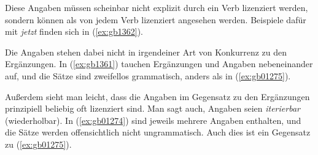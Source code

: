 \begin{exe}
  \ex\label{ex:gb1360}
  \begin{xlist}
  \end{xlist}
\end{exe}

Diese Angaben müssen scheinbar nicht explizit durch ein Verb lizenziert werden, sondern können als von jedem Verb lizenziert angesehen werden.
Beispiele dafür mit \textit{jetzt} finden sich in (\ref{ex:gb1362}).

\begin{exe}
  \ex\label{ex:gb1362}
  \begin{xlist}
  \end{xlist}
\end{exe}

Die Angaben stehen dabei nicht in irgendeiner Art von Konkurrenz zu den Ergänzungen.
In (\ref{ex:gb1361}) tauchen Ergänzungen und Angaben nebeneinander auf, und die Sätze sind zweifellos grammatisch, anders als in (\ref{ex:gb01275}).

\begin{exe}
  \ex\label{ex:gb1361}
  \begin{xlist}
  \end{xlist}
\end{exe}

Außerdem sieht man leicht, dass die Angaben im Gegensatz zu den Ergänzungen prinzipiell beliebig oft lizenziert sind.
Man sagt auch, Angaben seien \textit{iterierbar} (wiederholbar).
%
In (\ref{ex:gb01274}) sind jeweils mehrere Angaben enthalten, und die Sätze werden offensichtlich nicht ungrammatisch.
Auch dies ist ein Gegensatz zu (\ref{ex:gb01275}).

\begin{exe}
  \ex\label{ex:gb01274}
  \begin{xlist}
  \end{xlist}
\end{exe}

